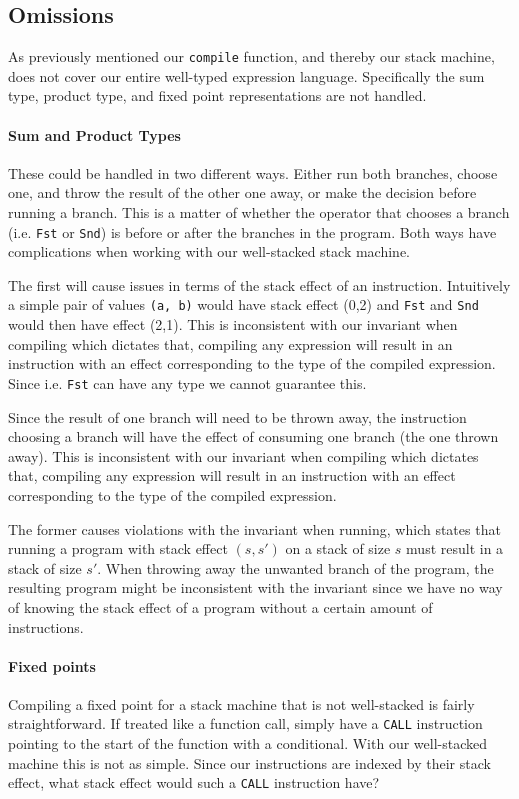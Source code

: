 \subsection{Omissions}
\label{sec:omissions}
As previously mentioned our \texttt{compile} function, and thereby our stack machine, does not cover our entire well-typed expression language. Specifically the sum type, product type, and fixed point representations are not handled. 

\paragraph{Sum and Product Types}
These could be handled in two different ways. Either run both branches, choose one, and throw the result of the other one away, or make the decision before running a branch. This is a matter of whether the operator that chooses a branch (i.e. \texttt{Fst} or \texttt{Snd}) is before or after the branches in the program. Both ways have complications when working with our well-stacked stack machine. 

The first will cause issues in terms of the stack effect of an instruction. Intuitively a simple pair of values \texttt{(a, b)} would have stack effect (0,2) and \texttt{Fst} and \texttt{Snd} would then have effect (2,1). This is inconsistent with our invariant when compiling which dictates that, compiling any expression will result in an instruction with an effect corresponding to the type of the compiled expression. Since i.e. \texttt{Fst} can have any type we cannot guarantee this.


Since the result of one branch will need to be thrown away, the instruction choosing a branch will have the effect of consuming one branch (the one thrown away). This is inconsistent with our invariant when compiling which dictates that, compiling any expression will result in an instruction with an effect corresponding to the type of the compiled expression. 

The former causes violations with the invariant when running, which states that running a program with stack effect $(s, s')$ on a stack of size $s$ must result in a stack of size $s'$. When throwing away the unwanted branch of the program, the resulting program might be inconsistent with the invariant since we have no way of knowing the stack effect of a program without a certain amount of instructions.

\paragraph{Fixed points}
Compiling a fixed point for a stack machine that is not well-stacked is fairly straightforward. If treated like a function call, simply have a \texttt{CALL} instruction pointing to the start of the function with a conditional. With our well-stacked machine this is not as simple. Since our instructions are indexed by their stack effect, what stack effect would such a \texttt{CALL} instruction have? 

